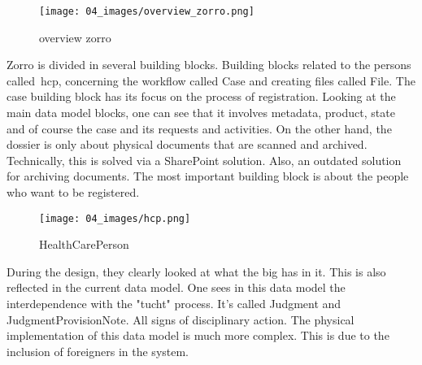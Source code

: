 \begin{wrapfigure} {r}{0.3\textwidth} 
\texttt{[image: 04\_images/overview\_zorro.png]}
\caption{overview zorro}
\label{fig:overview_zorro}
\end{wrapfigure}
Zorro is divided in several building blocks.
Building blocks related to the persons called~\acrfull{hcp}, concerning the workflow called Case and creating files called File.
The case building block has its focus on the process of registration. 
Looking at the main data model blocks, one can see that it involves metadata, product, state and of course the case and its requests and activities.
On the other hand, the dossier is only about physical documents that are scanned and archived.
Technically, this is solved via a SharePoint solution.
Also, an outdated solution for archiving documents.
The most important building block is about the people who want to be registered.
\begin{figure}
    \centering
    \texttt{[image: 04\_images/hcp.png]}
    \caption{HealthCarePerson}
    \label{fig:hcp}
\end{figure}
During the design, they clearly looked at what the \acrshort{big} has in it.
This is also reflected in the current data model.
One sees in this data model the interdependence with the "tucht" process.
It's called Judgment and JudgmentProvisionNote.
All signs of disciplinary action.
The physical implementation of this data model is much more complex.
This is due to the inclusion of foreigners in the system.
